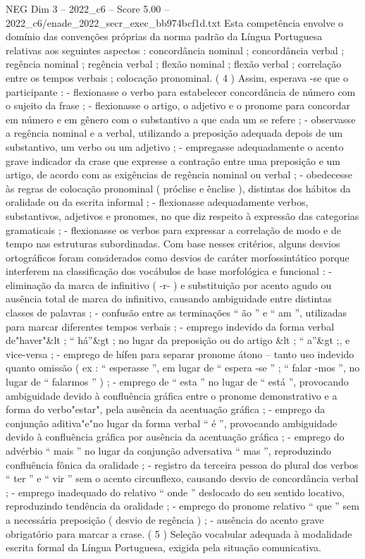 \begin{textsample}{NEG Dim 3 – 2022\_c6 – Score 5.00 – 2022\_c6/enade\_2022\_secr\_exec\_bb974bcf1d.txt}
Esta competência envolve o domínio das convenções próprias da norma padrão da Língua Portuguesa relativas aos seguintes aspectos : concordância nominal ; concordância verbal ; regência nominal ; regência verbal ; flexão nominal ; flexão verbal ; correlação entre os tempos verbais ; colocação pronominal. ( 4 ) Assim, esperava -se que o participante : - flexionasse o verbo para estabelecer concordância de número com o sujeito da frase ; - flexionasse o artigo, o adjetivo e o pronome para concordar em número e em gênero com o substantivo a que cada um se refere ; - observasse a regência nominal e a verbal, utilizando a preposição adequada depois de um substantivo, um verbo ou um adjetivo ; - empregasse adequadamente o acento grave indicador da crase que expresse a contração entre uma preposição e um artigo, de acordo com as exigências de regência nominal ou verbal ; - obedecesse às regras de colocação pronominal ( próclise e ênclise ), distintas dos hábitos da oralidade ou da escrita informal ; - flexionasse adequadamente verbos, substantivos, adjetivos e pronomes, no que diz respeito à expressão das categorias gramaticais ; - flexionasse os verbos para expressar a correlação de modo e de tempo nas estruturas subordinadas.
Com base nesses critérios, alguns desvios ortográficos foram considerados como desvios de caráter morfossintático porque interferem na classificação dos vocábulos de base morfológica e funcional : - eliminação da marca de infinitivo ( -r- ) e substituição por acento agudo ou ausência total de marca do infinitivo, causando ambiguidade entre distintas classes de palavras ; - confusão entre as terminações “ ão ” e “ am ”, utilizadas para marcar diferentes tempos verbais ; - emprego indevido da forma verbal de"haver"\&lt ; “ há”\&gt ; no lugar da preposição ou do artigo \&lt ; “ a”\&gt ;, e vice-versa ; - emprego de hífen para separar pronome átono – tanto uso indevido quanto omissão ( ex : “ esperasse ”, em lugar de “ espera -se ” ; “ falar -mos ”, no lugar de “ falarmos ” ) ; - emprego de “ esta ” no lugar de “ está ”, provocando ambiguidade devido à confluência gráfica entre o pronome demonstrativo e a forma do verbo"estar", pela ausência da acentuação gráfica ; - emprego da conjunção aditiva"e"no lugar da forma verbal “ é ”, provocando ambiguidade devido à confluência gráfica por ausência da acentuação gráfica ; - emprego do advérbio “ mais ” no lugar da conjunção adversativa “ mas ”, reproduzindo confluência fônica da oralidade ; - registro da terceira pessoa do plural dos verbos “ ter ” e “ vir ” sem o acento circunflexo, causando desvio de concordância verbal ; - emprego inadequado do relativo “ onde ” deslocado do seu sentido locativo, reproduzindo tendência da oralidade ; - emprego do pronome relativo “ que ” sem a necessária preposição ( desvio de regência ) ; - ausência do acento grave obrigatório para marcar a crase. ( 5 ) Seleção vocabular adequada à modalidade escrita formal da Língua Portuguesa, exigida pela situação comunicativa.

\end{textsample}
